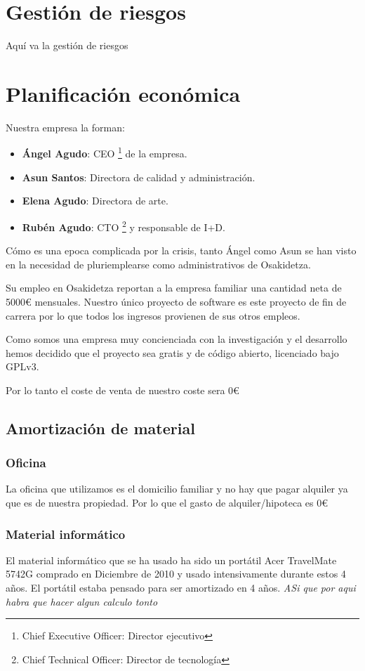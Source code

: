 \section{Gesti\'{o}n de riesgos}
Aquí va la gestión de riesgos

\section{Planificaci\'{o}n econ\'{o}mica}
Nuestra empresa la forman:
\begin{itemize}
    \item
    \textbf{Ángel Agudo}: CEO \footnote{Chief Executive Officer: Director ejecutivo} de la empresa.
    \item
    \textbf{Asun Santos}: Directora de calidad y administración.
    \item
    \textbf{Elena Agudo}: Directora de arte.
    \item
    \textbf{Rubén Agudo}: CTO \footnote{Chief Technical Officer: Director de tecnología} y responsable de I+D. 
\end{itemize}
Cómo es una epoca complicada por la crisis, tanto Ángel como Asun se han visto en la necesidad de pluriemplearse como administrativos de Osakidetza.

Su empleo en Osakidetza reportan a la empresa familiar una cantidad neta de 5000€ mensuales. Nuestro único proyecto de software es este proyecto de fin de carrera por lo que todos los ingresos provienen de sus otros empleos.

Como somos una empresa muy concienciada con la investigación y el desarrollo hemos decidido que el proyecto sea gratis y de código abierto, licenciado bajo GPLv3.

Por lo tanto el coste de venta de nuestro coste sera 0€

\subsection{Amortizaci\'{o}n de material}
\subsubsection{Oficina}
La oficina que utilizamos es el domicilio familiar y no hay que pagar alquiler ya que es de nuestra propiedad. Por lo que el gasto de alquiler/hipoteca es 0€
\subsubsection{Material inform\'{a}tico}
El material informático que se ha usado ha sido un portátil Acer TravelMate 5742G comprado en Diciembre de 2010 y usado intensivamente durante estos 4 años. El portátil estaba pensado para ser amortizado en 4 años. \emph{ASi que por aqui habra que hacer algun calculo tonto}

